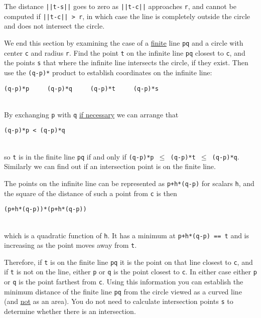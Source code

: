 \documentclass[12pt]{article}
\begin{document}
The distance {\tt ||t-s||} goes to zero as {\tt ||t-c||} approaches
{\tt r}, and cannot be computed if {\tt ||t-c|| > r}, in which case
the line is completely outside the circle and does not intersect the
circle.

We end this section by examining the case of a \underline{finite}
line {\tt pq} and a circle with center {\tt c} and radius {\tt r}.
Find the point {\tt t} on the infinite line {\tt pq} closest to
{\tt c}, and the points {\tt s} that where the infinite line intersects
the circle, if they exist.
Then use the {\tt (q-p)*} product to establish coordinates on the
infinite line: \\
\centerline{\tt (q-p)*p ~~~ (q-p)*q ~~~ (q-p)*t ~~~ (q-p)*s} \\
By exchanging {\tt p} with {\tt q}
\underline{if necessary} we can arrange that \\
\centerline{\tt (q-p)*p < (q-p)*q} \\
so {\tt t} is in the finite line {\tt pq} if and only if
{\tt (q-p)*p $\leq$ (q-p)*t $\leq$ (q-p)*q}.
Similarly we can find out if an intersection point is on the finite
line.

The points on the infinite line can be represented as
{\tt p+h*(q-p)} for scalars {\tt h}, and the square of the distance of such a
point from {\tt c} is then \\
\centerline{\tt (p+h*(q-p))*(p+h*(q-p))} \\
which is a quadratic
function of {\tt h}.  It has a minimum at {\tt p+h*(q-p) == t} and
is increasing as the point moves away from {\tt t}.

Therefore, if {\tt t} is on the finite line {\tt pq} it is the point on
that line closest to {\tt c}, and if {\tt t} is not on the line, either
{\tt p} or {\tt q} is the point closest to {\tt c}.  In either case
either {\tt p} or {\tt q} is the point farthest from {\tt c}.  Using
this information you can establish the minimum distance of the finite
line {\tt pq} from the circle viewed as a curved line (and \underline{not}
as an area).  You do not need to calculate intersection points {\tt s}
to determine whether there is an intersection.


\newpage
\end{document}
